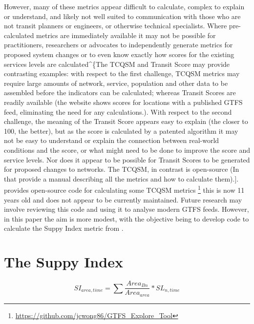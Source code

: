 \documentclass[]{tufte-book}
\begin{document}
However, many of these metrics appear difficult to calculate, complex to
explain or understand, and likely not well suited to communication with
those who are not transit planners or engineers, or otherwise technical
specialists. Where pre-calculated metrics are immediately available it
may not be possible for practitioners, researchers or advocates to
independently generate metrics for proposed system changes or to even
know exactly how scores for the existing services levels are
calculated\^{}\{The TCQSM and Transit Score may provide contrasting
examples: with respect to the first challenge, TCQSM metrics may require
large amounts of network, service, population and other data to be
assembled before the indicators can be calculated; whereas Transit
Scores are readily available (the \citet{WalkScore:2023tg} website shows
scores for locations with a published GTFS feed, eliminating the need
for any calculations.). With respect to the second challenge, the
meaning of the Transit Score appears easy to explain (the closer to 100,
the better), but as the score is calculated by a patented algorithm it
may not be easy to understand or explain the connection between
real-world conditions and the score, or what might need to be done to
improve the score and service levels. Nor does it appear to be possible
for Transit Scores to be generated for proposed changes to networks. The
TCQSM, in contrast is open-source (In that \citet{TCQSM:2013} provide a
manual describing all the metrics and how to calculate them).{]}.
\citet{Wong:2013aa} provides open-source code for calculating some TCQSM
metrics \footnote{\url{https://github.com/jcwong86/GTFS_Explore_Tool}}
this is now 11 years old and does not appear to be currently maintained.
Future research may involve reviewing this code and using it to analyse
modern GTFS feeds. However, in this paper the aim is more modest, with
the objective being to develop code to calculate the Suppy Index metric
from \citet{currie2007identifying}.

\hypertarget{the-suppy-index}{%
\section{The Suppy Index}\label{the-suppy-index}}

\begin{marginfigure}
\begin{equation}
\label{eq:supply_index}
  SI_{area, time} = \sum{\frac{Area_{Bn}}{Area_{area}}*SL_{n, time}}
\end{equation}
\end{marginfigure}
\end{document}
